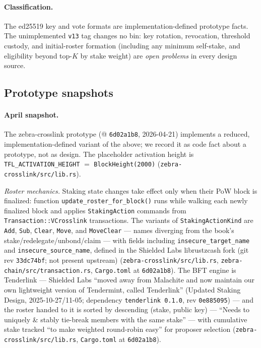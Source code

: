 \documentclass[11pt,a4paper]{article}
\theoremstyle{definition}
\begin{document}
\paragraph{Classification.} The ed25519 key and vote formats are
implementation-defined prototype facts. The unimplemented \texttt{v13}
tag changes no bin: key rotation, revocation,
threshold custody, and initial-roster formation (including any minimum
self-stake, and eligibility beyond top-$K$ by stake weight) are
\emph{open problems} in every design source.

\subsection{Prototype snapshots}\label{sec:xl-stake-prototype}

\paragraph{April snapshot.} The zebra-crosslink prototype
(@ \texttt{6d02a1b8}, 2026-04-21)
implements a reduced, implementation-defined variant of the above; we
record it as code fact about a prototype, not as design. The
placeholder activation height is \texttt{TFL\_ACTIVATION\_HEIGHT} $=$
\texttt{BlockHeight(2000)} (\texttt{zebra-crosslink/src/lib.rs}).

\emph{Roster mechanics.} Staking state changes take effect only when
their PoW block is finalized: function
\texttt{update\_roster\_for\_block()} runs while walking each newly
finalized block and applies \texttt{StakingAction} commands from
\texttt{Transaction::VCrosslink} transactions. The variants of
\texttt{StakingActionKind} are \texttt{Add}, \texttt{Sub},
\texttt{Clear}, \texttt{Move}, and \texttt{MoveClear} --- names diverging
from the book's stake/redelegate/unbond/claim --- with fields including
\texttt{insecure\_target\_name} and \texttt{insecure\_source\_name},
defined in the Shielded Labs librustzcash fork (git rev
\texttt{33dc74bf}; not present upstream)
(\texttt{zebra-crosslink/src/lib.rs},
\texttt{zebra-chain/src/transaction.rs}, \texttt{Cargo.toml} at
\texttt{6d02a1b8}). The BFT engine is Tenderlink --- Shielded Labs
``moved away from Malachite and now maintain our own lightweight version
of Tendermint, called Tenderlink'' (Updated Staking Design,
2025-10-27/11-05; dependency \texttt{tenderlink 0.1.0}, rev
\texttt{0e885095}) --- and the roster handed to it is sorted by
descending (stake, public key) --- ``Needs to uniquely \& stably
tie-break members with the same stake'' --- with cumulative stake
tracked ``to make weighted round-robin easy'' for proposer selection
(\texttt{zebra-crosslink/src/lib.rs}, \texttt{Cargo.toml} at
\texttt{6d02a1b8}).
\end{document}
